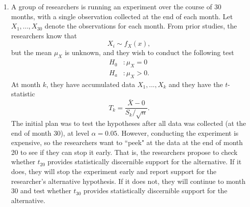 \documentclass{article}\usepackage[]{graphicx}\usepackage[]{xcolor}
\begin{document}
\begin{enumerate}
\item A group of researchers is running an experiment over the course of 30 months, 
with a single observation collected at the end of each month. Let $X_1, ..., X_{30}$
denote the observations for each month. From prior studies, the researchers know that
\[X_i \sim f_X(x),\]
but the mean $\mu_X$ is unknown, and they wish to conduct the following test
\begin{align*}
H_0&: \mu_X = 0\\
H_a&: \mu_X > 0.
\end{align*}
At month $k$, they have accumulated data $X_1, ..., X_k$ and they have the 
$t$-statistic
\[T_k = \frac{\bar{X} - 0}{S_k/\sqrt{n}}.\]
The initial plan was to test the hypotheses after all data was collected (at the 
end of month 30), at level $\alpha=0.05$. However, conducting the experiment is 
expensive, so the researchers want to ``peek" at the data at the end of month 20 
to see if they can stop it early. That is, the researchers propose to check 
whether $t_{20}$ provides statistically discernible support for the alternative. 
If it does, they will stop the experiment early and report support for the 
researcher's alternative hypothesis. If it does not, they will continue to month 
30 and test whether $t_{30}$ provides statistically discernible support for the
alternative.


\end{enumerate}
\end{document}
